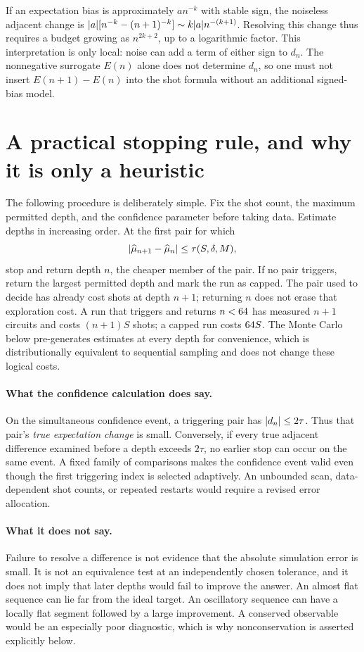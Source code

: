 \documentclass{article}
\DeclarePairedDelimiter{\abs}{\lvert}{\rvert}
\begin{document}
If an expectation bias is approximately $a n^{-k}$ with stable sign, the noiseless adjacent change is $\abs{a}[n^{-k}-(n+1)^{-k}]\sim k\abs{a}n^{-(k+1)}$. Resolving this change thus requires a budget growing as $n^{2 k+2}$, up to a logarithmic factor. This interpretation is only local: noise can add a term of either sign to $d_n$. The nonnegative surrogate $E(n)$ alone does not determine $d_n$, so one must not insert $E(n+1)-E(n)$ into the shot formula without an additional signed-bias model.

\section{A practical stopping rule, and why it is only a heuristic}
The following procedure is deliberately simple. Fix the shot count, the maximum permitted depth, and the confidence parameter before taking data. Estimate depths in increasing order. At the first pair for which
\begin{equation}\label{eq:stop}
 \abs{\widehat\mu_{n+1}-\widehat\mu_n}\leq\tau(S,\delta,M),
\end{equation}
stop and return depth $n$, the cheaper member of the pair. If no pair triggers, return the largest permitted depth and mark the run as capped. The pair used to decide has already cost shots at depth $n+1$; returning $n$ does not erase that exploration cost. A run that triggers and returns $n<64$ has measured $n+1$ circuits and costs $(n+1)S$ shots; a capped run costs $64 S$. The Monte Carlo below pre-generates estimates at every depth for convenience, which is distributionally equivalent to sequential sampling and does not change these logical costs.

\paragraph{What the confidence calculation does say.}
On the simultaneous confidence event, a triggering pair has $\abs{d_n}\leq2\tau$. Thus that pair's \emph{true expectation change} is small. Conversely, if every true adjacent difference examined before a depth exceeds $2\tau$, no earlier stop can occur on the same event. A fixed family of comparisons makes the confidence event valid even though the first triggering index is selected adaptively. An unbounded scan, data-dependent shot counts, or repeated restarts would require a revised error allocation.

\paragraph{What it does not say.}
Failure to resolve a difference is not evidence that the absolute simulation error is small. It is not an equivalence test at an independently chosen tolerance, and it does not imply that later depths would fail to improve the answer. An almost flat sequence can lie far from the ideal target. An oscillatory sequence can have a locally flat segment followed by a large improvement. A conserved observable would be an especially poor diagnostic, which is why nonconservation is asserted explicitly below.
\end{document}

